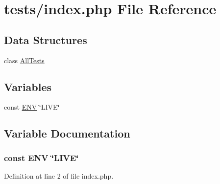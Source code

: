 \hypertarget{tests_2index_8php}{\section{tests/index.php File Reference}
\label{tests_2index_8php}
}
\subsection*{Data Structures}
\begin{DoxyCompactItemize}
\item 
class \hyperlink{class_all_tests}{All\-Tests}
\end{DoxyCompactItemize}
\subsection*{Variables}
\begin{DoxyCompactItemize}
\item 
const \hyperlink{tests_2index_8php_a47a71d9e3798fb8df7b92475169f8de4}{E\-N\-V} \char`\"{}L\-I\-V\-E\char`\"{}
\end{DoxyCompactItemize}


\subsection{Variable Documentation}
\hypertarget{tests_2index_8php_a47a71d9e3798fb8df7b92475169f8de4}{
\subsubsection[{E\-N\-V}]{\setlength{\rightskip}{0pt plus 5cm}const E\-N\-V \char`\"{}L\-I\-V\-E\char`\"{}}}\label{tests_2index_8php_a47a71d9e3798fb8df7b92475169f8de4}


Definition at line 2 of file index.\-php.

